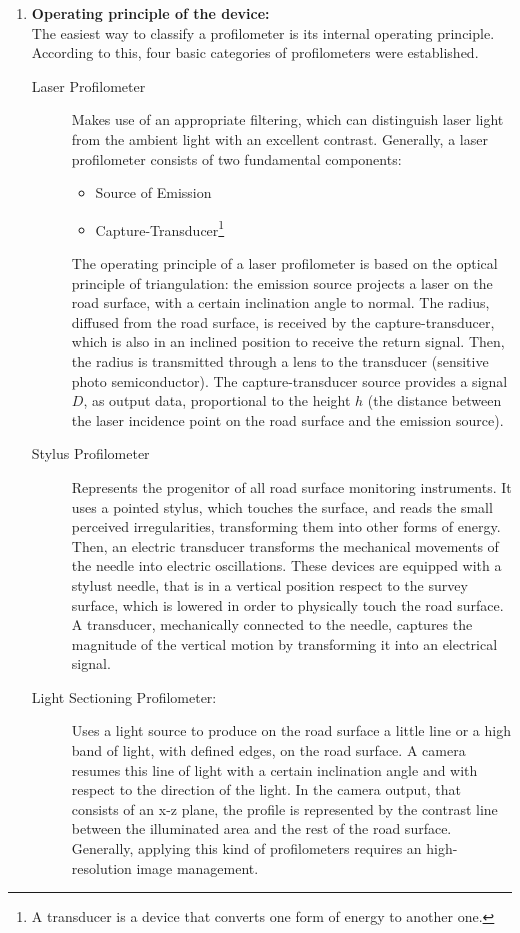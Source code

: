 \documentclass[tesi]{subfiles}
\begin{document}
\begin{enumerate}
\item \textbf{Operating principle of the device:}\\ The easiest way to classify a profilometer is its internal operating principle.\\ According to this, four basic categories of profilometers were established\cite{measuring_equipment}.

\begin{description}

\item [Laser Profilometer] Makes use of an appropriate filtering, which can distinguish laser light from the ambient light with an excellent contrast. Generally, a laser profilometer consists of two fundamental components:
\begin{itemize}
\item Source of Emission
\item Capture-Transducer\footnote{A transducer is a device that converts one form of energy to another one.}
\end{itemize}
The operating principle of a laser profilometer is based on the optical principle of triangulation: the emission source projects a laser on the road surface, with a certain inclination angle to normal. The radius, diffused from the road surface, is received by the capture-transducer, which is also in an inclined position to receive the return signal. Then, the radius is transmitted through a lens to the transducer\cite{arnberg1991laser} (sensitive photo semiconductor). The capture-transducer source provides a signal $D$, as output data, proportional to the height $h$ (the distance between the laser incidence point on the road surface and the emission source).
\item [Stylus Profilometer] Represents the progenitor of all road surface monitoring instruments. It uses a pointed stylus, which touches the surface, and reads the small perceived irregularities, transforming them into other forms of energy. Then, an electric transducer transforms the mechanical movements of the needle into electric oscillations. These devices are equipped with a stylust needle, that is in a vertical position respect to the survey surface, which is lowered in order to physically touch the road surface. A transducer, mechanically connected to the needle, captures the magnitude of the vertical motion by transforming it into an electrical signal.
\item [Light Sectioning Profilometer:] Uses a light source to produce on the road surface a little line or a high band of light, with defined edges, on the road surface. A camera resumes this line of light with a certain inclination angle and with respect to the direction of the light. In the camera output, that consists of an x-z plane, the profile is represented by the contrast line between the illuminated area and the rest of the road surface. Generally, applying this kind of profilometers requires an high-resolution image management.

\end{description}
\end{enumerate}
\end{document}
